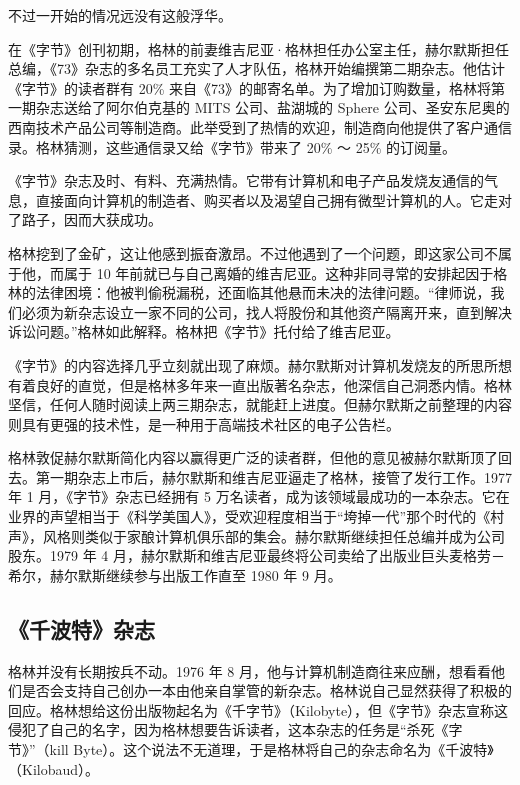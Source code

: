 \documentclass[12pt,UTF8]{ctexbook}
\begin{document}
不过一开始的情况远没有这般浮华。

在《字节》创刊初期，格林的前妻维吉尼亚·格林担任办公室主任，赫尔默斯担任总编，《73》杂志的多名员工充实了人才队伍，格林开始编撰第二期杂志。他估计《字节》的读者群有 20\% 来自《73》的邮寄名单。为了增加订购数量，格林将第一期杂志送给了阿尔伯克基的 MITS 公司、盐湖城的 Sphere 公司、圣安东尼奥的西南技术产品公司等制造商。此举受到了热情的欢迎，制造商向他提供了客户通信录。格林猜测，这些通信录又给《字节》带来了 20\% ～ 25\% 的订阅量。

《字节》杂志及时、有料、充满热情。它带有计算机和电子产品发烧友通信的气息，直接面向计算机的制造者、购买者以及渴望自己拥有微型计算机的人。它走对了路子，因而大获成功。

格林挖到了金矿，这让他感到振奋激昂。不过他遇到了一个问题，即这家公司不属于他，而属于 10 年前就已与自己离婚的维吉尼亚。这种非同寻常的安排起因于格林的法律困境：他被判偷税漏税，还面临其他悬而未决的法律问题。“律师说，我们必须为新杂志设立一家不同的公司，找人将股份和其他资产隔离开来，直到解决诉讼问题。”格林如此解释。格林把《字节》托付给了维吉尼亚。

《字节》的内容选择几乎立刻就出现了麻烦。赫尔默斯对计算机发烧友的所思所想有着良好的直觉，但是格林多年来一直出版著名杂志，他深信自己洞悉内情。格林坚信，任何人随时阅读上两三期杂志，就能赶上进度。但赫尔默斯之前整理的内容则具有更强的技术性，是一种用于高端技术社区的电子公告栏。

格林敦促赫尔默斯简化内容以赢得更广泛的读者群，但他的意见被赫尔默斯顶了回去。第一期杂志上市后，赫尔默斯和维吉尼亚逼走了格林，接管了发行工作。1977 年 1 月，《字节》杂志已经拥有 5 万名读者，成为该领域最成功的一本杂志。它在业界的声望相当于《科学美国人》，受欢迎程度相当于“垮掉一代”那个时代的《村声》，风格则类似于家酿计算机俱乐部的集会。赫尔默斯继续担任总编并成为公司股东。1979 年 4 月，赫尔默斯和维吉尼亚最终将公司卖给了出版业巨头麦格劳－希尔，赫尔默斯继续参与出版工作直至 1980 年 9 月。





\subsection{《千波特》杂志}


格林并没有长期按兵不动。1976 年 8 月，他与计算机制造商往来应酬，想看看他们是否会支持自己创办一本由他亲自掌管的新杂志。格林说自己显然获得了积极的回应。格林想给这份出版物起名为《千字节》（Kilobyte），但《字节》杂志宣称这侵犯了自己的名字，因为格林想要告诉读者，这本杂志的任务是“杀死《字节》”（kill Byte）。这个说法不无道理，于是格林将自己的杂志命名为《千波特》（Kilobaud）。
\end{document}
